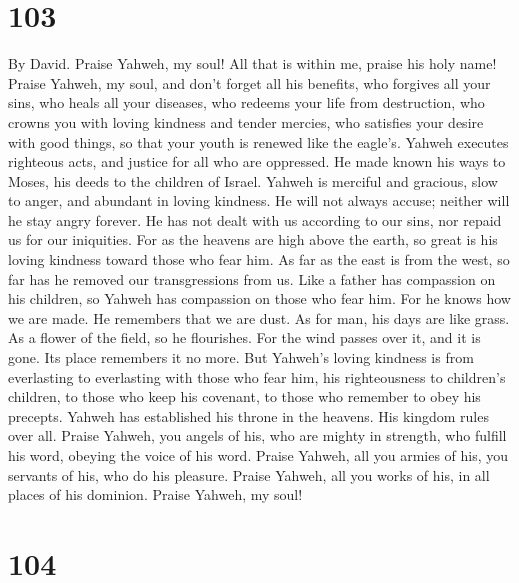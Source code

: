 \hypertarget{section-93}{%
\section{103}\label{section-93}}

By David.  Praise Yahweh, my soul! All that is within me,
praise his holy name!  Praise Yahweh, my soul, and don't
forget all his benefits,  who forgives all your sins, who
heals all your diseases,  who redeems your life from
destruction, who crowns you with loving kindness and tender mercies,
 who satisfies your desire with good things, so that your
youth is renewed like the eagle's.  Yahweh executes
righteous acts, and justice for all who are oppressed.  He
made known his ways to Moses, his deeds to the children of Israel.
 Yahweh is merciful and gracious, slow to anger, and
abundant in loving kindness.  He will not always accuse;
neither will he stay angry forever.  He has not dealt with
us according to our sins, nor repaid us for our iniquities.
 For as the heavens are high above the earth, so great is
his loving kindness toward those who fear him.  As far as
the east is from the west, so far has he removed our transgressions from
us.  Like a father has compassion on his children, so
Yahweh has compassion on those who fear him.  For he knows
how we are made. He remembers that we are dust.  As for
man, his days are like grass. As a flower of the field, so he
flourishes.  For the wind passes over it, and it is gone.
Its place remembers it no more.  But Yahweh's loving
kindness is from everlasting to everlasting with those who fear him, his
righteousness to children's children,  to those who keep
his covenant, to those who remember to obey his precepts. 
Yahweh has established his throne in the heavens. His kingdom rules over
all.  Praise Yahweh, you angels of his, who are mighty in
strength, who fulfill his word, obeying the voice of his word.
 Praise Yahweh, all you armies of his, you servants of his,
who do his pleasure.  Praise Yahweh, all you works of his,
in all places of his dominion. Praise Yahweh, my soul!

\hypertarget{section-94}{%
\section{104}\label{section-94}}

